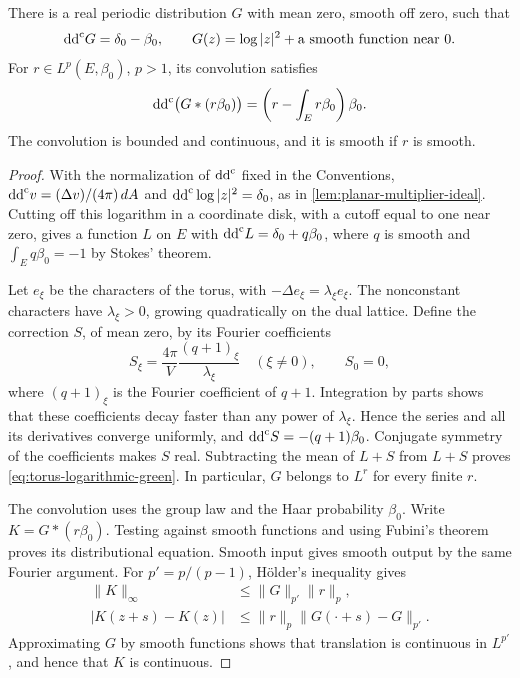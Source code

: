 \begin{lemma}\label{lem:torus-logarithmic-green}
There is a real periodic distribution $G$ with mean zero, smooth off zero, such that
\begin{equation}\label{eq:torus-logarithmic-green}
 \mathrm{dd}^{\mathrm{c}} G=\delta_0-\beta_0,\qquad
 G(z)=\log|z|^2+\text{a smooth function near }0.
\end{equation}
For $r\in L^p(E,\beta_0)$, $p>1$, its convolution satisfies
\[
 \mathrm{dd}^{\mathrm{c}}\bigl(G*(r\beta_0)\bigr)
       =\left(r-\int_Er\beta_0\right)\beta_0.
\]
The convolution is bounded and continuous, and it is smooth if $r$ is smooth.
\end{lemma}
\begin{proof}
With the normalization of $\mathrm{dd}^{\mathrm{c}}$ fixed in the Conventions, $\mathrm{dd}^{\mathrm{c}} v=(\Delta v)/(4\pi)\,dA$ and $\mathrm{dd}^{\mathrm{c}}\log|z|^2=\delta_0$, as in \cref{lem:planar-multiplier-ideal}. Cutting off this logarithm in a coordinate disk, with a cutoff equal to one near zero, gives a function $L$ on $E$ with $\mathrm{dd}^{\mathrm{c}} L=\delta_0+q\beta_0$, where $q$ is smooth and $\int_Eq\beta_0=-1$ by Stokes' theorem.

Let $e_\xi$ be the characters of the torus, with $-\Delta e_\xi=\lambda_\xi e_\xi$. The nonconstant characters have $\lambda_\xi>0$, growing quadratically on the dual lattice. Define the correction $S$, of mean zero, by its Fourier coefficients
\[
 S_\xi=\frac{4\pi}{V}\frac{(q+1)_\xi}{\lambda_\xi}
       \quad(\xi\ne0),\qquad S_0=0,
\]
where $(q+1)_\xi$ is the Fourier coefficient of $q+1$. Integration by parts shows that these coefficients decay faster than any power of $\lambda_\xi$. Hence the series and all its derivatives converge uniformly, and $\mathrm{dd}^{\mathrm{c}} S=-(q+1)\beta_0$. Conjugate symmetry of the coefficients makes $S$ real. Subtracting the mean of $L+S$ from $L+S$ proves \eqref{eq:torus-logarithmic-green}. In particular, $G$ belongs to $L^r$ for every finite $r$.

The convolution uses the group law and the Haar probability $\beta_0$. Write $K=G*(r\beta_0)$. Testing against smooth functions and using Fubini's theorem proves its distributional equation. Smooth input gives smooth output by the same Fourier argument. For $p'=p/(p-1)$, H\"older's inequality gives
\[
 \begin{aligned}
 \|K\|_\infty&\leq\|G\|_{p'}\|r\|_p,\\
 |K(z+s)-K(z)|
     &\leq\|r\|_p\|G(\cdot+s)-G\|_{p'}.
 \end{aligned}
\]
Approximating $G$ by smooth functions shows that translation is continuous in $L^{p'}$, and hence that $K$ is continuous.
\end{proof}

